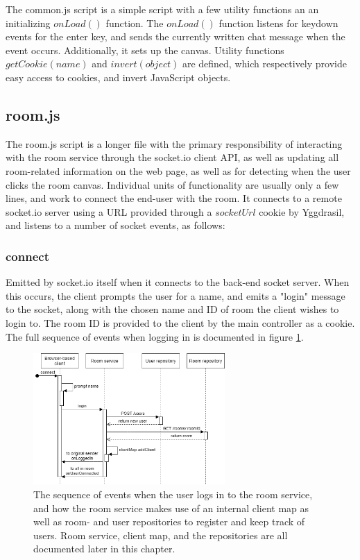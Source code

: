 The common.js script is a simple script with a few utility functions an an initializing $onLoad()$ function. The $onLoad()$ function listens for keydown events for the enter key, and sends the currently written chat message when the event occurs. Additionally, it sets up the canvas. Utility functions $getCookie(name)$ and $invert(object)$ are defined, which respectively provide easy access to cookies, and invert JavaScript objects.

\subsection{room.js}

The room.js script is a longer file with the primary responsibility of interacting with the room service through the socket.io client API, as well as updating all room-related information on the web page, as well as for detecting when the user clicks the room canvas. Individual units of functionality are usually only a few lines, and work to connect the end-user with the room. It connects to a remote socket.io server using a URL provided through a $socketUrl$ cookie by Yggdrasil, and listens to a number of socket events, as follows:

\subsubsection{connect}

Emitted by socket.io itself when it connects to the back-end socket server. When this occurs, the client prompts the user for a name, and emits a "login" message to the socket, along with the chosen name and ID of room the client wishes to login to. The room ID is provided to the client by the main controller as a cookie. The full sequence of events when logging in is documented in figure \ref{fig:heimdalllogin}.

\begin{figure}[H]
    \centering
    \includegraphics[width=0.65\textwidth]{Pictures/HaimdallLogin.png}
    \caption{The sequence of events when the user logs in to the room service, and how the room service makes use of an internal client map as well as room- and user repositories to register and keep track of users. Room service, client map, and the repositories are all documented later in this chapter.}
    \label{fig:heimdalllogin}
\end{figure}

